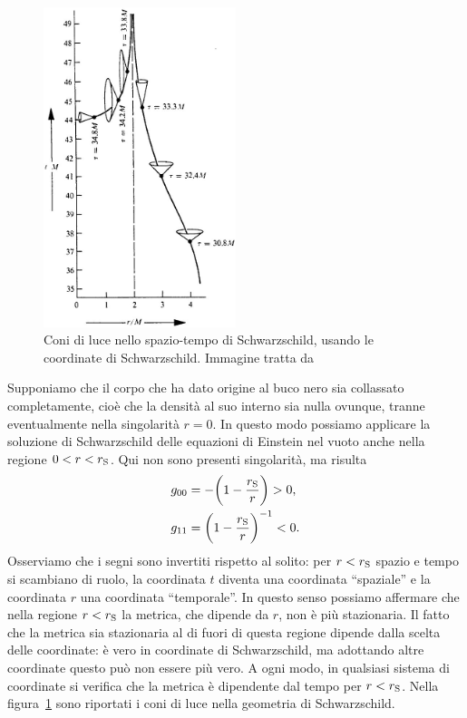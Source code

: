 \begin{figure}[tb]
  \centering
  \includegraphics[width=0.5\textwidth]{figure/Schwarzschilddiagram.jpg}
  \caption[Coni di luce nello spazio-tempo di Schwarzschild, usando le
  coordinate di Schwarzschild]{Coni di luce nello spazio-tempo di Schwarzschild,
    usando le coordinate di Schwarzschild.  Immagine tratta
    da~\textcite[848]{misner:gravitation}}
  \label{fig:coni-schwarzschild}
\end{figure}
Supponiamo che il corpo che ha dato origine al buco nero sia collassato
completamente, cioè che la densità al suo interno sia nulla ovunque, tranne
eventualmente nella singolarità \(r = 0\).  In questo modo possiamo applicare la
soluzione di Schwarzschild delle equazioni di Einstein nel vuoto anche nella
regione \(0 < r < r_{\textup{S}}\).  Qui non sono presenti singolarità, ma
risulta
\begin{subequations}
  \begin{align}
    g_{00} &= -\biggl(1 - \frac{r_{\textup{S}}}{r}\biggr) > 0, \\
    g_{11} &= \biggl(1 - \frac{r_{\textup{S}}}{r}\biggr)^{-1} < 0.
  \end{align}
\end{subequations}
Osserviamo che i segni sono invertiti rispetto al solito: per \(r <
r_{\textup{S}}\) spazio e tempo si scambiano di ruolo, la coordinata \(t\)
diventa una coordinata ``spaziale'' e la coordinata \(r\) una coordinata
``temporale''.  In questo senso possiamo affermare che nella regione \(r <
r_{\textup{S}}\) la metrica, che dipende da \(r\), non è più stazionaria.  Il
fatto che la metrica sia stazionaria al di fuori di questa regione dipende dalla
scelta delle coordinate: è vero in coordinate di Schwarzschild, ma adottando
altre coordinate questo può non essere più vero.  A ogni modo, in qualsiasi
sistema di coordinate si verifica che la metrica è dipendente dal tempo per \(r
< r_{\textup{S}}\).  Nella figura~\ref{fig:coni-schwarzschild} sono riportati i
coni di luce nella geometria di Schwarzschild.

